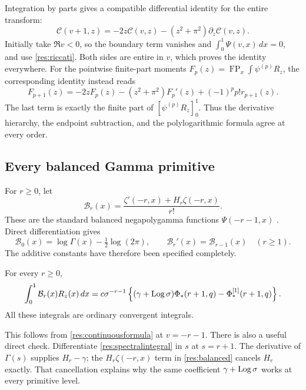 Integration by parts gives a compatible differential identity for
the entire transform:
\begin{equation}\label{res:continuous-recurrence}
 \mathcal C(v+1,z)
      =-2z\mathcal C(v,z)-(z^2+\pi^2)\partial_z\mathcal C(v,z).
\end{equation}
Initially take $\Re v<0$, so the boundary term vanishes and
$\int_0^1\Psi(v,x)\,dx=0$, and use \eqref{res:riccati}.
Both sides are entire in $v$, which proves the identity everywhere.
For the pointwise finite-part moments
$F_p(z)=\operatorname{FP}_x\int\psi^{(p)}R_z$, the corresponding
identity instead reads
\begin{equation}\label{res:pointwise-recurrence}
 F_{p+1}(z)=-2zF_p(z)-(z^2+\pi^2)F_p'(z)
                         +(-1)^pp!r_{p+1}(z).
\end{equation}
The last term is exactly the finite part of $[\psi^{(p)}R_z]_0^1$.
Thus the derivative hierarchy, the endpoint subtraction, and the
polylogarithmic formula agree at every order.

\subsection{Every balanced Gamma primitive}

For $r\ge0$, let
\begin{equation}\label{res:balanced}
 \mathcal B_r(x)=\frac{\zeta'(-r,x)+H_r\zeta(-r,x)}{r!}.
\end{equation}
These are the standard balanced negapolygamma functions
$\Psi(-r-1,x)$ \cite{EM}. Direct differentiation gives
\[
 \mathcal B_0(x)=\log\Gamma(x)-\tfrac12\log(2\pi),\qquad
 \mathcal B_r'(x)=\mathcal B_{r-1}(x)\quad(r\ge1).
\]
The additive constants have therefore been specified completely.

\begin{corollary}
\label{res:balancedcor}
For every $r\ge0$,
\begin{equation}\label{res:balancedmoment}
 \int_0^1\mathcal B_r(x)R_z(x)\,dx
    =c\sigma^{-r-1}
       \left\{(\gamma+\operatorname{Log}\sigma)\Phi_*(r+1,q)
                                      -\Phi_*^{[1]}(r+1,q)\right\}.
\end{equation}
All these integrals are ordinary convergent integrals.
\end{corollary}

This follows from \eqref{res:continuousformula} at $v=-r-1$.
There is also a useful direct check. Differentiate
\eqref{res:spectralintegral} in $s$ at $s=r+1$. The derivative of
$\Gamma(s)$ supplies $H_r-\gamma$; the $H_r\zeta(-r,x)$ term
in \eqref{res:balanced} cancels $H_r$ exactly. That cancellation
explains why the same coefficient $\gamma+\operatorname{Log}\sigma$ works at
every primitive level.

